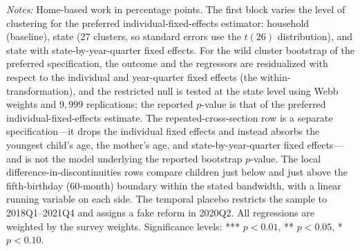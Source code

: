 \begin{table}[H]\centering
\caption{Inference and Estimator Robustness of the Home-Based-Work Effect}
\label{tab:inference}\small
{}
\par\vspace{3pt}\footnotesize\raggedright \textit{Notes:} Home-based work in percentage points. The first block varies the level of clustering for the preferred individual-fixed-effects estimator: household (baseline), state (27 clusters, so standard errors use the $t(26)$ distribution), and state with state-by-year-quarter fixed effects. For the wild cluster bootstrap of the preferred specification, the outcome and the regressors are residualized with respect to the individual and year-quarter fixed effects (the within-transformation), and the restricted null is tested at the state level using Webb weights and $9{,}999$ replications; the reported $p$-value is that of the preferred individual-fixed-effects estimate. The repeated-cross-section row is a separate specification---it drops the individual fixed effects and instead absorbs the youngest child's age, the mother's age, and state-by-year-quarter fixed effects---and is not the model underlying the reported bootstrap $p$-value. The local difference-in-discontinuities rows compare children just below and just above the fifth-birthday (60-month) boundary within the stated bandwidth, with a linear running variable on each side. The temporal placebo restricts the sample to 2018Q1--2021Q4 and assigns a fake reform in 2020Q2. All regressions are weighted by the survey weights. Significance levels: *** $p<0.01$, ** $p<0.05$, * $p<0.10$.
\end{table}
